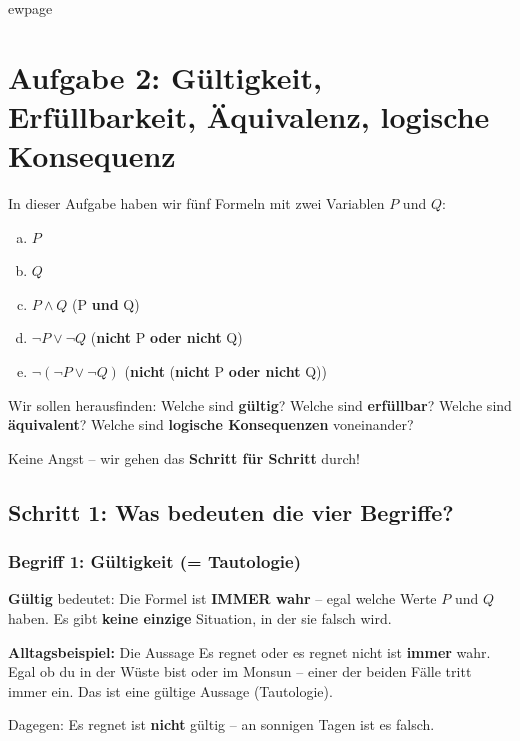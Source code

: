\documentclass[a4paper,12pt]{article}
\begin{document}
ewpage

\section{Aufgabe 2: G\"ultigkeit, Erf\"ullbarkeit, \"Aquivalenz, logische Konsequenz}

In dieser Aufgabe haben wir f\"unf Formeln mit zwei Variablen $P$ und $Q$:
\begin{enumerate}[(a)]
\item $P$
\item $Q$
\item $P \wedge Q$ \quad (P \textbf{und} Q)
\item $\neg P \vee \neg Q$ \quad (\textbf{nicht} P \textbf{oder nicht} Q)
\item $\neg(\neg P \vee \neg Q)$ \quad (\textbf{nicht} (\textbf{nicht} P \textbf{oder nicht} Q))
\end{enumerate}

Wir sollen herausfinden: Welche sind \textbf{g\"ultig}? Welche sind \textbf{erf\"ullbar}? Welche sind \textbf{\"aquivalent}? Welche sind \textbf{logische Konsequenzen} voneinander?

Keine Angst -- wir gehen das \textbf{Schritt f\"ur Schritt} durch!

\subsection{Schritt 1: Was bedeuten die vier Begriffe?}

\subsubsection*{Begriff 1: G\"ultigkeit (= Tautologie)}

\begin{merkbox}
\textbf{G\"ultig} bedeutet: Die Formel ist \textbf{IMMER wahr} -- egal welche Werte $P$ und $Q$ haben. Es gibt \textbf{keine einzige} Situation, in der sie falsch wird.
\end{merkbox}

\begin{analogie}
\textbf{Alltagsbeispiel:} Die Aussage \glqq Es regnet oder es regnet nicht\grqq{} ist \textbf{immer} wahr. Egal ob du in der W\"uste bist oder im Monsun -- einer der beiden F\"alle tritt immer ein. Das ist eine g\"ultige Aussage (Tautologie).

\smallskip
Dagegen: \glqq Es regnet\grqq{} ist \textbf{nicht} g\"ultig -- an sonnigen Tagen ist es falsch.
\end{analogie}
\end{document}
